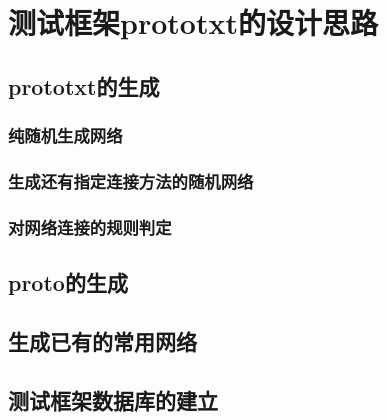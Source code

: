 ﻿\chapter{测试框架prototxt的设计思路}

\section{prototxt的生成}

\subsection{纯随机生成网络}

\subsection{生成还有指定连接方法的随机网络}

\subsection{对网络连接的规则判定}

\section{proto的生成}

\section{生成已有的常用网络}

\section{测试框架数据库的建立}